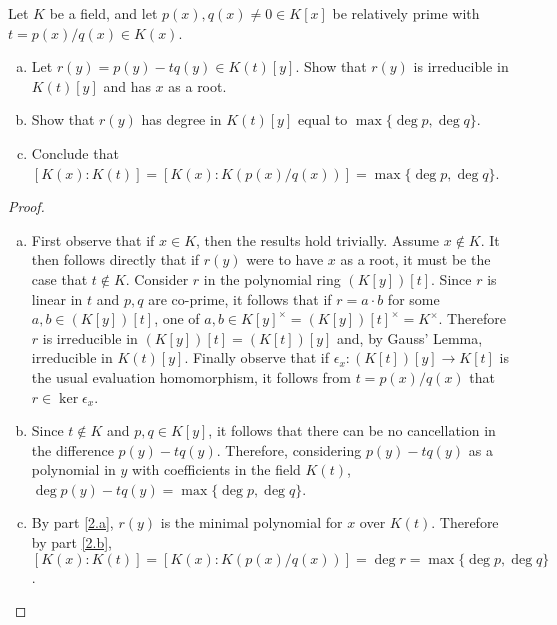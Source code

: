 \documentclass[10pt]{amsart}
\begin{document}
\begin{thm}
  Let $K$ be a field, and let $p(x), q(x) \neq 0 \in K[x]$ be relatively prime with $t = p(x)/q(x) \in K(x)$.
  \begin{enumerate}[(a)]
  \item
    Let $r(y) = p(y) - tq(y) \in K(t)[y]$.
    Show that $r(y)$ is irreducible in $K(t)[y]$ and has $x$ as a root.
  \item
    Show that $r(y)$ has degree in $K(t)[y]$ equal to $\max\{\deg{p}, \deg{q}\}$.
  \item
    Conclude that $[K(x) : K(t)] = [K(x) : K(p(x)/q(x))] = \max\{\deg{p}, \deg{q}\}$.
  \end{enumerate}
  \begin{proof}
    \begin{enumerate}[(a)]
    \item\label{2.a}
      First observe that if $x \in K$, then the results hold trivially.
      Assume $x \not \in K$.
      It then follows directly that if $r(y)$ were to have $x$ as a root, it must be the case that $t \not \in K$.
      Consider $r$ in the polynomial ring $(K[y])[t]$.
      Since $r$ is linear in $t$ and $p,q$ are co-prime, it follows that if $r = a \cdot b$ for some $a,b \in (K[y])[t]$, one of $a,b \in K[y]^\times = (K[y])[t]^\times = K^\times$.
      Therefore $r$ is irreducible in $(K[y])[t] = (K[t])[y]$ and, by Gauss' Lemma, irreducible in $K(t)[y]$.
      Finally observe that if $\epsilon_x \colon (K[t])[y] \rightarrow K[t]$ is the usual evaluation homomorphism, it follows from $t = p(x)/q(x)$ that $r \in \ker \epsilon_x$.
    \item\label{2.b}
      Since $t \not \in K$ and $p,q \in K[y]$, it follows that there can be no cancellation in the difference $p(y) - tq(y)$.
      Therefore, considering $p(y) - tq(y)$ as a polynomial in $y$ with coefficients in the field $K(t)$, $\deg{p(y) - tq(y)} = \max\{\deg{p}, \deg{q}\}$.
    \item
      By part \eqref{2.a}, $r(y)$ is the minimal polynomial for $x$ over $K(t)$.
      Therefore by part \eqref{2.b}, $[K(x) : K(t)] = [K(x) : K(p(x)/q(x))] = \deg{r} = \max\{\deg{p}, \deg{q}\}$.
    \end{enumerate}
  \end{proof}
\end{thm}
\end{document}

